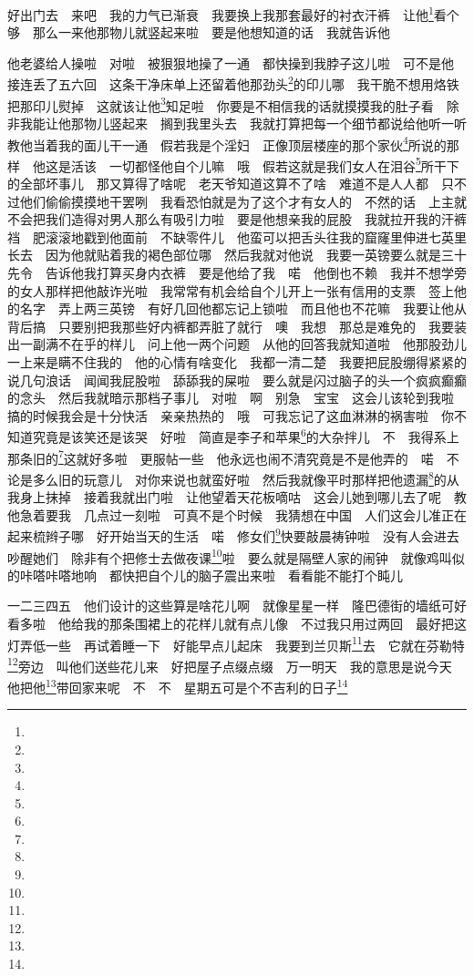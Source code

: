 \par 好出门去　来吧　我的力气已渐衰　我要换上我那套最好的衬衣汗裤　让他\footnote{}看个够　那么一来他那物儿就竖起来啦　要是他想知道的话　我就告诉他　
\par 他老婆给人操啦　对啦　被狠狠地操了一通　都快操到我脖子这儿啦　可不是他　接连丢了五六回　这条干净床单上还留着他那劲头\footnote{}的印儿哪　我干脆不想用烙铁把那印儿熨掉　这就该让他\footnote{}知足啦　你要是不相信我的话就摸摸我的肚子看　除非我能让他那物儿竖起来　搁到我里头去　我就打算把每一个细节都说给他听一听　教他当着我的面儿干一通　假若我是个淫妇　正像顶层楼座的那个家伙\footnote{}所说的那样　他这是活该　一切都怪他自个儿嘛　哦　假若这就是我们女人在泪谷\footnote{}所干下的全部坏事儿　那又算得了啥呢　老天爷知道这算不了啥　难道不是人人都　只不过他们偷偷摸摸地干罢咧　我看恐怕就是为了这个才有女人的　不然的话　上主就不会把我们造得对男人那么有吸引力啦　要是他想亲我的屁股　我就拉开我的汗裤裆　肥滚滚地戳到他面前　不缺零件儿　他蛮可以把舌头往我的窟窿里伸进七英里长去　因为他就贴着我的褐色部位哪　然后我就对他说　我要一英镑要么就是三十先令　告诉他我打算买身内衣裤　要是他给了我　喏　他倒也不赖　我并不想学旁的女人那样把他敲诈光啦　我常常有机会给自个儿开上一张有信用的支票　签上他的名字　弄上两三英镑　有好几回他都忘记上锁啦　而且他也不花嘛　我要让他从背后搞　只要别把我那些好内裤都弄脏了就行　噢　我想　那总是难免的　我要装出一副满不在乎的样儿　问上他一两个问题　从他的回答我就知道啦　他那股劲儿一上来是瞒不住我的　他的心情有啥变化　我都一清二楚　我要把屁股绷得紧紧的　说几句浪话　闻闻我屁股啦　舔舔我的屎啦　要么就是闪过脑子的头一个疯疯癫癫的念头　然后我就暗示那档子事儿　对啦　啊　别急　宝宝　这会儿该轮到我啦　搞的时候我会是十分快活　亲亲热热的　哦　可我忘记了这血淋淋的祸害啦　你不知道究竟是该笑还是该哭　好啦　简直是李子和苹果\footnote{}的大杂拌儿　不　我得系上那条旧的\footnote{}这就好多啦　更服帖一些　他永远也闹不清究竟是不是他弄的　喏　不论是多么旧的玩意儿　对你来说也就蛮好啦　然后我就像平时那样把他遗漏\footnote{}的从我身上抹掉　接着我就出门啦　让他望着天花板嘀咕　这会儿她到哪儿去了呢　教他急着要我　几点过一刻啦　可真不是个时候　我猜想在中国　人们这会儿准正在起来梳辫子哪　好开始当天的生活　喏　修女们\footnote{}快要敲晨祷钟啦　没有人会进去吵醒她们　除非有个把修士去做夜课\footnote{}啦　要么就是隔壁人家的闹钟　就像鸡叫似的咔嗒咔嗒地响　都快把自个儿的脑子震出来啦　看看能不能打个盹儿　
\par 一二三四五　他们设计的这些算是啥花儿啊　就像星星一样　隆巴德街的墙纸可好看多啦　他给我的那条围裙上的花样儿就有点儿像　不过我只用过两回　最好把这灯弄低一些　再试着睡一下　好能早点儿起床　我要到兰贝斯\footnote{}去　它就在芬勒特\footnote{}旁边　叫他们送些花儿来　好把屋子点缀点缀　万一明天　我的意思是说今天　他把他\footnote{}带回家来呢　不　不　星期五可是个不吉利的日子\footnote{}　
